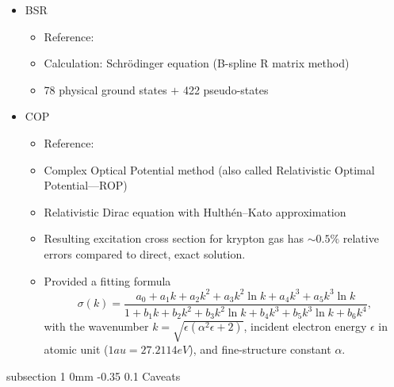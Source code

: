 \documentclass[11pt]{article}
\makeatletter
\renewcommand{\subsection}{\@startsection
{subsection}%
{1}%
{0mm}%
{-0.35\baselineskip}%
{0.1\baselineskip}%
{\normalfont\large\bfseries\color{myTan}}}%
\makeatother
\begin{document}
\begin{itemize}
\item BSR
\begin{itemize}
\item Reference: \cite{Zatsarinny2004,Zatsarinny2014,Zatsarinny2013}
\item Calculation: Schr\"{o}dinger equation (B-spline R matrix method)
\item 78 physical ground states $+$ 422 pseudo-states
\end{itemize}
\item COP
\begin{itemize}
\item Reference: \cite{Pitchford2017,Chen2008,Mceachran2014}
\item Complex Optical Potential method (also called Relativistic Optimal Potential---ROP)
\item Relativistic Dirac equation with Hulth\'{e}n--Kato approximation
\item Resulting excitation cross section for krypton gas has $\sim0.5\%$ relative errors compared to direct, exact solution.
\item Provided a fitting formula~\cite[Eq 7, Table 1]{Mceachran2014}
\begin{equation}
\sigma(k) = \frac{a_0 + a_1k + a_2k^2 + a_3k^2\ln{k} + a_4k^3 + a_5k^3\ln{k}}{1 + b_1k + b_2k^2 + b_3k^2\ln{k} + b_4k^3 + b_5k^3\ln{k} + b_6k^4},
\end{equation}
with the wavenumber $k=\sqrt{\epsilon(\alpha^2\epsilon+2)}$, incident electron energy $\epsilon$ in atomic unit ($1 au = 27.2114eV$), and fine-structure constant $\alpha$.
\end{itemize}
\end{itemize}


\subsection{Caveats}
\end{document}
